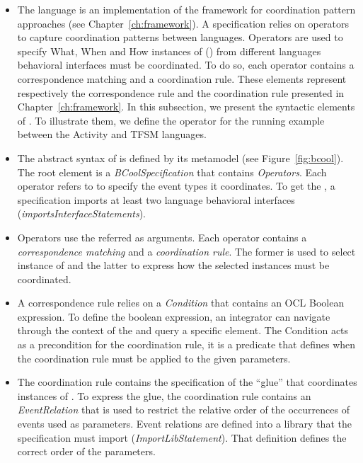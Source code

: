 \begin{itemize}
	\item The \bcool language is an implementation of the framework for coordination pattern approaches (see Chapter~\ref{ch:framework}). A \bcool specification relies on operators to capture coordination patterns between languages. Operators are used to specify What, When and How instances of \dse (\mse) from different languages behavioral interfaces must be coordinated. To do so, each operator contains a correspondence matching and a coordination rule. These elements represent respectively the correspondence rule and the coordination rule presented in Chapter~\ref{ch:framework}. In this subsection, we present the syntactic elements of \bcool. To illustrate them, we define the operator for the running example between the Activity and TFSM languages.
	
	\item The abstract syntax of \bcool is defined by its metamodel (see Figure~\ref{fig:bcool}). The root element is a \emph{BCoolSpecification} that contains \emph{Operators}. Each operator refers to \dse to specify the event types it coordinates. To get the \dse, a \bcool specification imports at least two language behavioral interfaces (\emph{importsInterfaceStatements}). 
	
	\item Operators use the referred \dse as arguments. Each operator contains a \emph{correspondence matching} and a \emph{coordination rule}. The former is used to select instance of \dse and the latter to express how the selected instances must be coordinated. 
	
	\item A correspondence rule relies on a \emph{Condition} that contains an OCL Boolean expression. To define the boolean expression, an integrator can navigate through the context of the \dse and query a specific element. The Condition acts as a precondition for the coordination rule, \ie it is a predicate that defines when the coordination rule must be applied to the given parameters.
	
	\item The coordination rule contains the specification of the ``glue'' that coordinates instances of \dse. To express the glue, the coordination rule contains an \emph{EventRelation} that is used to restrict the relative order of the occurrences of events used as parameters. Event relations are defined into a \moccml library that the \bcool specification must import (\emph{ImportLibStatement}). That definition defines the correct order of the parameters. 
	

\end{itemize}
